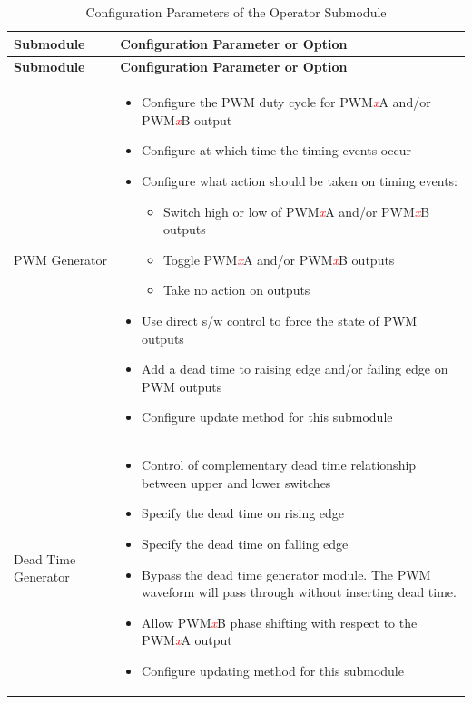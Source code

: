 \begin{longtable}[c]{|m{5cm}|m{10cm}|}
\caption{Configuration Parameters of the Operator Submodule}
\label{tab:mcpwm-param-operator}
    \\\hline
    \rowcolor{lightgray}
   \textbf{Submodule} & \textbf{Configuration Parameter or Option} \\ \hline 

\endfirsthead\hline
 \rowcolor{lightgray}
   \textbf{Submodule} & \textbf{Configuration Parameter or Option}\\
 \hline 
\endhead
\endfoot
    PWM Generator &\vspace{-1em}
    \begin{itemize}
        \item Configure the PWM duty cycle for PWM\textcolor{red}{\it{x}}A and/or PWM\textcolor{red}{\it{x}}B output
        \item Configure at which time the timing events occur
        \item Configure what action should be taken on timing events:
        \begin{itemize}
           \item Switch high or low of PWM\textcolor{red}{\it{x}}A and/or PWM\textcolor{red}{\it{x}}B outputs
           \item Toggle PWM\textcolor{red}{\it{x}}A and/or PWM\textcolor{red}{\it{x}}B outputs
           \item Take no action on outputs
        \end{itemize}
        \item Use direct s/w control to force the state of PWM outputs
        \item Add a dead time to raising edge and/or failing edge on PWM outputs
        \item Configure update method for this submodule\vspace{-1em}
    \end{itemize}\\\hline
    
    Dead Time Generator &\vspace{-1em}
    \begin{itemize}
        \item Control of complementary dead time relationship between upper and lower switches
        \item Specify the dead time on rising edge
        \item Specify the dead time on falling edge
        \item Bypass the dead time generator module. The PWM waveform will pass through without inserting dead time.
        \item Allow PWM\textcolor{red}{\it{x}}B phase shifting with respect to the PWM\textcolor{red}{\it{x}}A output
        \item Configure updating method for this submodule\vspace{-1em}
    \end{itemize}\\\hline
    

\end{longtable}
